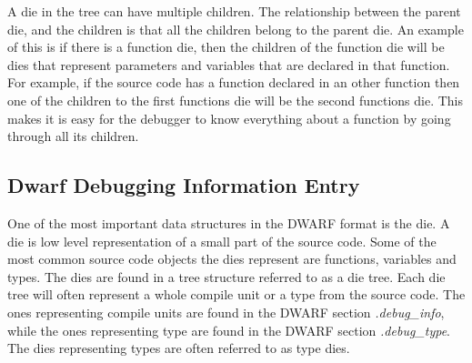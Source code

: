 A \gls{die} in the tree can have multiple children.
The relationship between the parent \gls{die}, and the children is that all the children belong to the parent \gls{die}.
An example of this is if there is a function \gls{die}, then the children of the function \gls{die} will be \glspl{die} that represent parameters and variables that are declared in that function.
For example, if the source code has a function declared in an other function then one of the children to the first functions \gls{die} will be the second functions \gls{die}.
This makes it is easy for the debugger to know everything about a function by going through all its children.



\subsection{Dwarf Debugging Information Entry}
 


One of the most important data structures in the \gls{DWARF} format is the \gls{die}.
A \gls{die} is low level representation of a small part of the source code.
Some of the most common source code objects the \glspl{die} represent are functions, variables and types.
The \glspl{die} are found in a tree structure referred to as a \gls{die} tree.
Each \gls{die} tree will often represent a whole compile unit or a type from the source code.
The ones representing compile units are found in the \gls{DWARF} section \emph{.debug\_info}, while the ones representing type are found in the \gls{DWARF} section \emph{.debug\_type}.
The \glspl{die} representing types are often referred to as type \glspl{die}.



